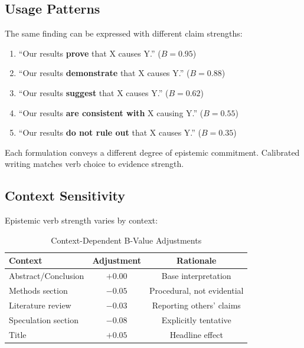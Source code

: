 \documentclass[11pt,a4paper]{article}
\theoremstyle{remark}
\begin{document}
\subsection{Usage Patterns}

\begin{examplebox}[title={Epistemic Verb Comparison}]
The same finding can be expressed with different claim strengths:

\begin{enumerate}
    \item ``Our results \textbf{prove} that X causes Y.'' ($B = 0.95$)
    \item ``Our results \textbf{demonstrate} that X causes Y.'' ($B = 0.88$)
    \item ``Our results \textbf{suggest} that X causes Y.'' ($B = 0.62$)
    \item ``Our results \textbf{are consistent with} X causing Y.'' ($B = 0.55$)
    \item ``Our results \textbf{do not rule out} that X causes Y.'' ($B = 0.35$)
\end{enumerate}

Each formulation conveys a different degree of epistemic commitment. Calibrated writing matches verb choice to evidence strength.
\end{examplebox}

\subsection{Context Sensitivity}

Epistemic verb strength varies by context:

\begin{table}[h]
\centering
\caption{Context-Dependent B-Value Adjustments}
\label{tab:context-verbs}
\begin{tabular}{lcc}
\toprule
\textbf{Context} & \textbf{Adjustment} & \textbf{Rationale} \\
\midrule
Abstract/Conclusion & $+0.00$ & Base interpretation \\
Methods section & $-0.05$ & Procedural, not evidential \\
Literature review & $-0.03$ & Reporting others' claims \\
Speculation section & $-0.08$ & Explicitly tentative \\
Title & $+0.05$ & Headline effect \\
\bottomrule
\end{tabular}
\end{table}
\end{document}
